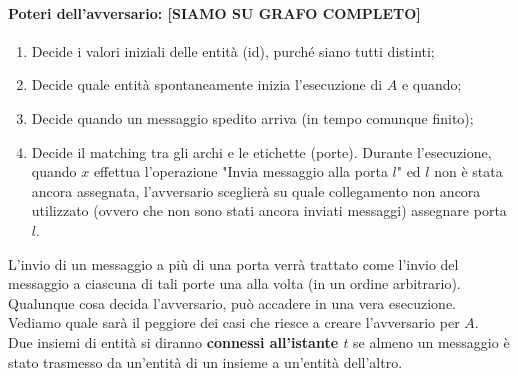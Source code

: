 \paragraph{Poteri dell'avversario: [SIAMO SU GRAFO COMPLETO]}
\begin{enumerate}
    \item Decide i valori iniziali delle entità (id), purché siano tutti distinti;
    \item Decide quale entità spontaneamente inizia l'esecuzione di $A$ e quando;
    \item Decide quando un messaggio spedito arriva (in tempo comunque finito);
    \item Decide il matching tra gli archi e le etichette (porte). Durante
          l'esecuzione, quando $x$ effettua l'operazione "Invia messaggio alla porta
          $l$" ed $l$ non è stata ancora assegnata, l'avversario sceglierà su quale
          collegamento non ancora utilizzato (ovvero che non sono stati ancora inviati
          messaggi) assegnare porta $l$.
\end{enumerate}

L'invio di un messaggio a più di una porta verrà trattato come l'invio del
messaggio a ciascuna di tali porte una alla volta (in un ordine arbitrario).\\
Qualunque cosa decida l'avversario, può accadere in una vera esecuzione.
Vediamo quale sarà il peggiore dei casi che riesce a creare l'avversario per $A$.\\

Due insiemi di entità si diranno \textbf{connessi all'istante $t$} se almeno un
messaggio è stato trasmesso da un'entità di un insieme a un'entità dell'altro.

